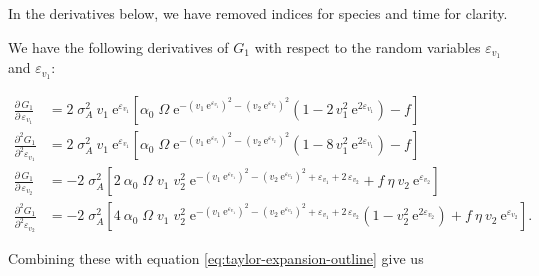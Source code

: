 In the derivatives below, we have removed indices for species and time for clarity.


We have the following derivatives of $G_1$ with respect to the random variables $\varepsilon_{v_1}$ and $\varepsilon_{v_1}$:

\begin{equation*}
\begin{split}
    \frac{\partial \, G_1}{\partial \, \varepsilon_{v_1}} &= 2 \; \sigma_A^2 \: v_{1} \: \text{e}^{\varepsilon_{v_1}}
    \left[
        \alpha_0 \; \Omega \;
            \text{e}^{-(v_{1} \: \text{e}^{\varepsilon_{v_1}})^2 - (v_{2} \: \text{e}^{\varepsilon_{v_2}})^2}
            \left(
                1 - 2 \, v_{1}^2 \: \text{e}^{2 \varepsilon_{v_1}}
            \right)
        - f
    \right] \\
% 
    \frac{\partial^2 G_1}{\partial^2 \varepsilon_{v_1}} &= 2 \; \sigma_A^2 \: v_{1} \: \text{e}^{\varepsilon_{v_1}}
    \left[
        \alpha_0 \; \Omega \;
            \text{e}^{-(v_{1} \: \text{e}^{\varepsilon_{v_1}})^2 - (v_{2} \: \text{e}^{\varepsilon_{v_2}})^2}
            \left(
                1 - 8 \, v_{1}^2 \: \text{e}^{2 \varepsilon_{v_1}}
            \right)
        - f
    \right] \\[2ex]
%
%
    \frac{\partial \, G_1}{\partial \, \varepsilon_{v_2}} &= - 2 \; \sigma_A^2
    \left[
        2 \: \alpha_0 \; \Omega \; v_1 \; v_2^2 \;
            \text{e}^{-(v_{1} \: \text{e}^{\varepsilon_{v_1}})^2 - (v_{2} \: \text{e}^{\varepsilon_{v_2}})^2 + \varepsilon_{v_1} + 2 \, \varepsilon_{v_2}}
        + f \: \eta \: v_2 \: \text{e}^{\varepsilon_{v_2}}
    \right] \\
% 
    \frac{\partial^2 G_1}{\partial^2 \varepsilon_{v_2}} &= - 2 \; \sigma_A^2
    \left[
        4 \: \alpha_0 \; \Omega \; v_1 \; v_2^2 \;
            \text{e}^{-(v_{1} \: \text{e}^{\varepsilon_{v_1}})^2 - (v_{2} \: \text{e}^{\varepsilon_{v_2}})^2 + \varepsilon_{v_1} + 2 \, \varepsilon_{v_2}}
            \left(
                1 - v_{2}^2 \: \text{e}^{2 \varepsilon_{v_2}}
            \right)
        + f \: \eta \: v_2 \: \text{e}^{\varepsilon_{v_2}}
    \right]
\text{.}
\end{split}
\end{equation*}


Combining these with equation \ref{eq:taylor-expansion-outline} give us 

